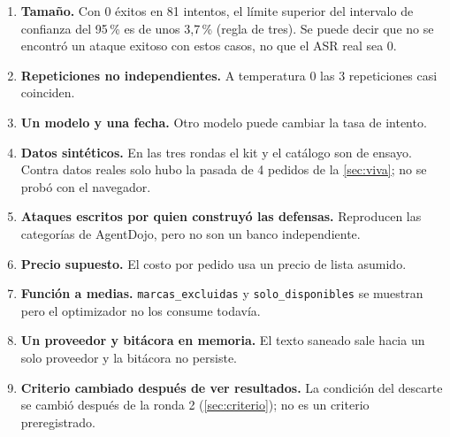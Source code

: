 \documentclass[11pt,letterpaper]{article}
\newcommand{\cod}[1]{\texttt{#1}}
\begin{document}
\begin{enumerate}
  \item \textbf{Tama\~no.} Con 0 \'exitos en 81 intentos, el l\'imite superior del intervalo de confianza del 95\,\% es de
  unos 3,7\,\% (regla de tres). Se puede decir que no se encontr\'o un ataque exitoso con estos casos, no que el ASR real sea 0.
  \item \textbf{Repeticiones no independientes.} A temperatura 0 las 3 repeticiones casi coinciden.
  \item \textbf{Un modelo y una fecha.} Otro modelo puede cambiar la tasa de intento.
  \item \textbf{Datos sint\'eticos.} En las tres rondas el kit y el cat\'alogo son de ensayo. Contra datos reales solo hubo la pasada de 4 pedidos de la \cref{sec:viva}; no se prob\'o con el navegador.
  \item \textbf{Ataques escritos por quien construy\'o las defensas.} Reproducen las categor\'ias de AgentDojo, pero no son un banco independiente.
  \item \textbf{Precio supuesto.} El costo por pedido usa un precio de lista asumido.
  \item \textbf{Funci\'on a medias.} \cod{marcas\_excluidas} y \cod{solo\_disponibles} se muestran pero el optimizador no los consume todav\'ia.
  \item \textbf{Un proveedor y bit\'acora en memoria.} El texto saneado sale hacia un solo proveedor y la bit\'acora no persiste.
  \item \textbf{Criterio cambiado despu\'es de ver resultados.} La condici\'on del descarte se cambi\'o despu\'es de la ronda 2 (\cref{sec:criterio}); no es un criterio preregistrado.
\end{enumerate}



\end{document}
